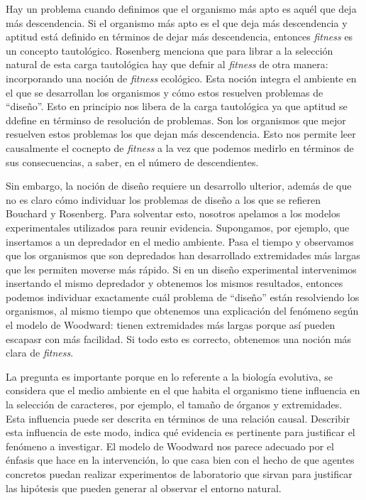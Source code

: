 Hay un problema cuando definimos que el organismo más apto es aquél que deja más descendencia. Si el organismo más apto es el que deja más descendencia y aptitud está definido en términos de dejar más descendencia, entonces \emph{fitness} es un concepto tautológico. Rosenberg menciona que para librar a la selección natural de esta carga tautológica hay que defnir al \emph{fitness} de otra manera: incorporando una noción de \emph{fitness} ecológico. Esta noción integra el ambiente en el que se desarrollan los organismos y cómo estos resuelven problemas de ``diseño''. Esto en principio nos libera de la carga tautológica ya que aptitud se ddefine en términso de resolución de problemas. Son los organismos que mejor resuelven estos problemas los que dejan más descendencia. Esto nos permite leer causalmente el cocnepto de \emph{fitness} a la vez que podemos medirlo en términos de sus consecuencias, a saber, en el número de descendientes.

Sin embargo, la noción de diseño requiere un desarrollo ulterior, además de que no es claro cómo individuar los problemas de diseño a los que se refieren Bouchard y Rosenberg. Para solventar esto, nosotros apelamos a los modelos experimentales utilizados para reunir evidencia. Supongamos, por ejemplo, que insertamos a un depredador en el medio ambiente. Pasa el tiempo y observamos que los organismos que son depredados han desarrollado extremidades más largas que les permiten moverse más rápido. Si en un diseño experimental intervenimos insertando el mismo depredador y obtenemos los mismos resultados, entonces podemos individuar exactamente cuál problema de ``diseño'' están resolviendo los organismos, al mismo tiempo que obtenemos una explicación del fenómeno según el modelo de Woodward: tienen extremidades más largas porque así pueden escapasr con más facilidad. Si todo esto es correcto, obtenemos una noción más clara de \emph{fitness}.

La pregunta es importante porque en lo referente a la biología evolutiva, se considera que el medio ambiente en el que habita el organismo tiene influencia en la selección de caracteres, por ejemplo, el tamaño de órganos y extremidades. Esta influencia puede ser descrita en términos de una relación causal. Describir esta influencia de este modo, indica qué evidencia es pertinente para justificar el fenómeno a investigar. El modelo de Woodward nos parece adecuado por el énfasis que hace en la intervención, lo que casa bien con el hecho de que agentes concretos puedan realizar experimentos de laboratorio que sirvan para justificar las hipótesis que pueden generar al observar el entorno natural.



